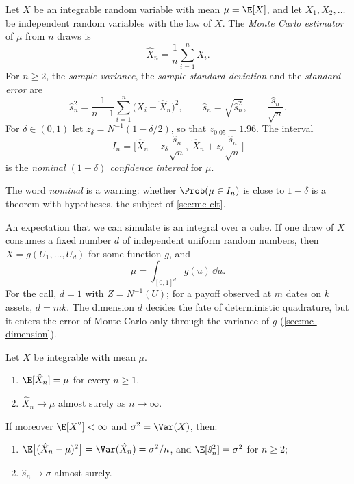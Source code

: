 \begin{definition}\label{def:mc-estimator}
Let $X$ be an integrable random variable with mean $\mu=\E[X]$, and let $X_1,X_2,\dots$ be
independent random variables with the law of $X$. The \emph{Monte Carlo estimator} of $\mu$
from $n$ draws is
\[
  \hat X_n=\frac1n\sum_{i=1}^nX_i .
\]
For $n\ge2$, the \emph{sample variance}, the \emph{sample standard deviation} and the
\emph{standard error} are
\[
  \hat s_n^2=\frac{1}{n-1}\sum_{i=1}^n\big(X_i-\hat X_n\big)^2,\qquad
  \hat s_n=\sqrt{\hat s_n^2},\qquad \frac{\hat s_n}{\sqrt n}.
\]
For $\delta\in(0,1)$ let $z_\delta=N^{-1}(1-\delta/2)$, so that $z_{0.05}=1.96$. The interval
\begin{equation}\label{eq:mc-ci}
  I_n=\Big[\hat X_n-z_\delta\frac{\hat s_n}{\sqrt n},\ \hat X_n+z_\delta\frac{\hat s_n}{\sqrt n}\Big]
\end{equation}
is the \emph{nominal $(1-\delta)$ confidence interval} for $\mu$.
\end{definition}

The word \emph{nominal} is a warning: whether $\Prob(\mu\in I_n)$ is close to $1-\delta$ is a
theorem with hypotheses, the subject of \cref{sec:mc-clt}.

An expectation that we can simulate is an integral over a cube. If one draw of $X$
consumes a fixed number $d$ of independent uniform random numbers, then $X=g(U_1,\dots,U_d)$ for some
function $g$, and
\begin{equation}\label{eq:mc-integral}
  \mu=\int_{[0,1]^d}g(u)\,\dd u .
\end{equation}
For the call, $d=1$ with $Z=N^{-1}(U)$; for a payoff observed at $m$ dates on $k$ assets,
$d=mk$. The dimension $d$ decides the fate of deterministic quadrature, but it enters the
error of Monte Carlo only through the variance of $g$ (\cref{sec:mc-dimension}).

\begin{proposition}\label{prop:mc-unbiased}
Let $X$ be integrable with mean $\mu$.
\begin{enumerate}[label=(\roman*)]
  \item $\E[\hat X_n]=\mu$ for every $n\ge1$.
  \item $\hat X_n\to\mu$ almost surely as $n\to\infty$.
\end{enumerate}
If moreover $\E[X^2]<\infty$ and $\sigma^2=\Var(X)$, then:
\begin{enumerate}[label=(\roman*),resume]
  \item $\E\big[(\hat X_n-\mu)^2\big]=\Var(\hat X_n)=\sigma^2/n$, and $\E[\hat s_n^2]=\sigma^2$
    for $n\ge2$;
  \item $\hat s_n\to\sigma$ almost surely.
\end{enumerate}
\end{proposition}

